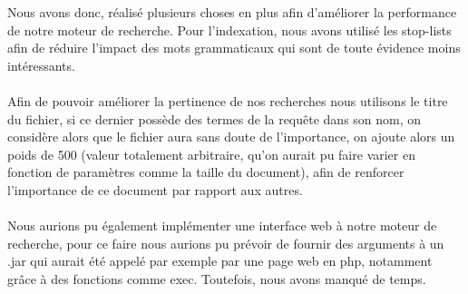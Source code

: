 \documentclass{article}
\begin{document}
Nous avons donc, réalisé plusieurs choses en plus afin d'améliorer la performance de notre moteur de recherche. 
Pour l'indexation, nous avons utilisé les stop-lists afin de réduire l'impact des mots grammaticaux qui sont de toute évidence 
moins intéressants.\\ 
\\
Afin de pouvoir améliorer la pertinence de nos recherches nous utilisons le titre du fichier, si ce dernier possède des termes de 
la requête dans son nom, on considère alors que le fichier aura sans doute de l'importance, on ajoute alors un poids de 500 (valeur 
totalement arbitraire, qu'on aurait pu faire varier en fonction de paramètres comme la taille du document), afin de renforcer l'importance de ce 
document par rapport aux autres.\\
\\
Nous aurions pu également implémenter une interface web à notre moteur de recherche, pour ce faire nous aurions pu prévoir de fournir des arguments à un .jar
qui aurait été appelé par exemple par une page web en php, notamment grâce à des fonctions comme exec. Toutefois, nous avons manqué de temps.
\end{document}
